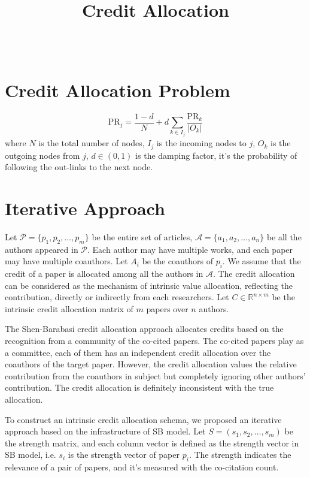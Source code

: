 \documentclass[12pt]{article}
\title{Credit Allocation}
\author{~}
\numberwithin{table}{section}
\begin{document}
\maketitle

\noindent

\section{Credit Allocation Problem}

\[
\textrm{PR}_j = \frac{1-d}{N} + d \sum_{k\in I_j} \frac{\textrm{PR}_k}{|O_k|}
\]
where $N$ is the total number of nodes, $I_j$ is the incoming nodes to $j$, $O_k$ is the outgoing nodes from $j$, $d \in(0,1)$ is the damping factor, it's the probability of following the out-links to the next node.

\section{Iterative Approach}
Let $\mathcal P=\{p_1,p_2,\ldots,p_m\}$ be the entire set of articles, $\mathcal A=\{a_1,a_2,\ldots,a_n\}$ be all the authors appeared in $\mathcal P$. Each author may have multiple works, and each paper may have multiple coauthors. Let $A_i$ be the coauthors of $p_i$. We assume that the credit of a paper is allocated among all the authors in $\mathcal A$. The credit allocation can be considered as the mechanism of intrinsic value allocation, reflecting the contribution, directly or indirectly from each researchers. Let $C\in \mathbb R^{n\times m}$ be the intrinsic credit allocation matrix of $m$ papers over $n$ authors.

The Shen-Barabasi credit allocation approach allocates credits based on the recognition from a community of the co-cited papers. The co-cited papers play as a committee, each of them has an independent credit allocation over the coauthors of the target paper. However, the credit allocation values the relative contribution from the coauthors in subject but completely ignoring other authors' contribution. The credit allocation is definitely inconsistent with the true allocation.

To construct an intrinsic credit allocation schema, we proposed an iterative approach based on the infrastructure of SB model. Let $S=(s_1,s_2,\ldots,s_m)$ be the strength matrix, and each column vector is defined as the strength vector in SB model, i.e. $s_i$ is the strength vector of paper $p_i$. The strength indicates the relevance of a pair of papers, and it's measured with the co-citation count. 
\end{document}
